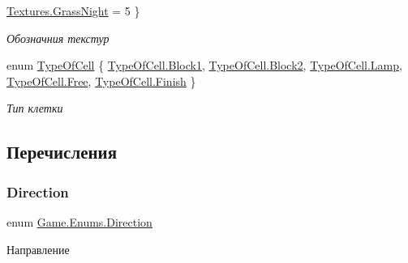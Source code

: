 \begin{DoxyCompactItemize}
\hyperlink{namespace_game_1_1_enums_a2d1ea7762a7b4609383b4b578d1c4a60af20f7ae1531e4dc39cefc9d0c6cd819a}{Textures.\+Grass\+Night} = 5
 \}\begin{DoxyCompactList}\small\item\em Обозначния текстур \end{DoxyCompactList}
\item 
enum \hyperlink{namespace_game_1_1_enums_ab6782702f41f926eb2b923ee03a88069}{Type\+Of\+Cell} \{ \newline
\hyperlink{namespace_game_1_1_enums_ab6782702f41f926eb2b923ee03a88069ab3e25d19bfd437de6063953f0f4ac6ac}{Type\+Of\+Cell.\+Block1}, 
\hyperlink{namespace_game_1_1_enums_ab6782702f41f926eb2b923ee03a88069a3fbe9f2beae8654b86e2d9570f63d4e2}{Type\+Of\+Cell.\+Block2}, 
\hyperlink{namespace_game_1_1_enums_ab6782702f41f926eb2b923ee03a88069a5331717d33d4e634fd3c5ec209f475d2}{Type\+Of\+Cell.\+Lamp}, 
\hyperlink{namespace_game_1_1_enums_ab6782702f41f926eb2b923ee03a88069ab24ce0cd392a5b0b8dedc66c25213594}{Type\+Of\+Cell.\+Free}, 
\newline
\hyperlink{namespace_game_1_1_enums_ab6782702f41f926eb2b923ee03a88069aa20ddccbb6f808ec42cd66323e6c6061}{Type\+Of\+Cell.\+Finish}
 \}\begin{DoxyCompactList}\small\item\em Тип клетки \end{DoxyCompactList}
\end{DoxyCompactItemize}


\subsection{Перечисления}
\mbox{\label{namespace_game_1_1_enums_afecfa7946d85e70582de0c788cc185bd}} 
\subsubsection{\texorpdfstring{Direction}{Direction}}
{\footnotesize\ttfamily enum \hyperlink{namespace_game_1_1_enums_afecfa7946d85e70582de0c788cc185bd}{Game.\+Enums.\+Direction}\hspace{0.3cm}{\ttfamily [strong]}}



Направление 

